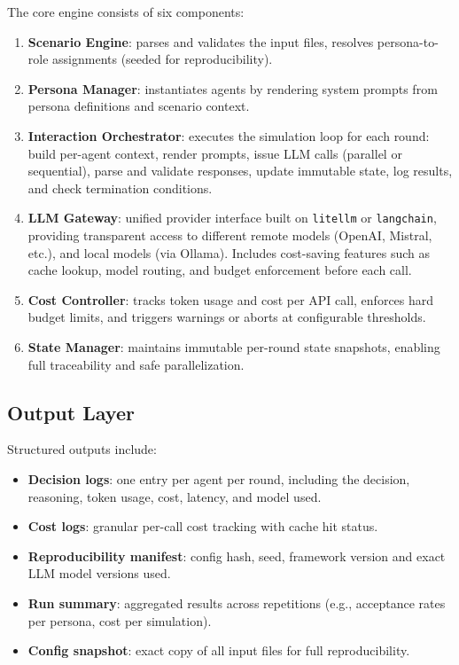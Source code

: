 \documentclass[12pt, a4paper]{article}
\begin{document}
The core engine consists of six components:
\begin{enumerate}
    \item \textbf{Scenario Engine}: parses and validates the input files, resolves persona-to-role assignments (seeded for reproducibility).
    \item \textbf{Persona Manager}: instantiates agents by rendering system prompts from persona definitions and scenario context.
    \item \textbf{Interaction Orchestrator}: executes the simulation loop for each round: build per-agent context, render prompts, issue LLM calls (parallel or sequential), parse and validate responses, update immutable state, log results, and check termination conditions.
    \item \textbf{LLM Gateway}: unified provider interface built on \texttt{litellm} or \texttt{langchain}, providing transparent access to different remote models (OpenAI, Mistral, etc.), and local models (via Ollama). Includes cost-saving features such as cache lookup, model routing, and budget enforcement before each call.
    \item \textbf{Cost Controller}: tracks token usage and cost per API call, enforces hard budget limits, and triggers warnings or aborts at configurable thresholds.
    \item \textbf{State Manager}: maintains immutable per-round state snapshots, enabling full traceability and safe parallelization.
\end{enumerate}

\subsection*{Output Layer}

Structured outputs include:
\begin{itemize}
    \item \textbf{Decision logs}: one entry per agent per round, including the decision, reasoning, token usage, cost, latency, and model used.
    \item \textbf{Cost logs}: granular per-call cost tracking with cache hit status.
    \item \textbf{Reproducibility manifest}: config hash, seed, framework version and exact LLM model versions used.
    \item \textbf{Run summary}: aggregated results across repetitions (e.g., acceptance rates per persona, cost per simulation).
    \item \textbf{Config snapshot}: exact copy of all input files for full reproducibility.
\end{itemize}
\end{document}
